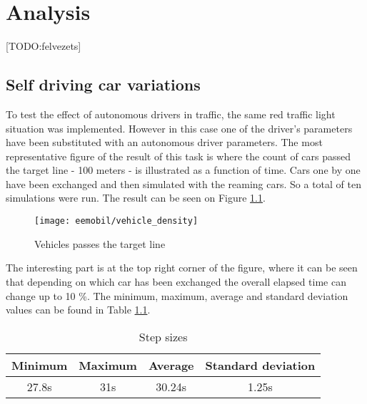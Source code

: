 \chapter{Analysis}
	[TODO:felvezets]
	\section{Self driving car variations}
		To test the effect of autonomous drivers in traffic, the same red traffic light situation was implemented. However in this case one of the driver's parameters have been substituted with an autonomous driver parameters. The most representative figure of the result of this task is where the count of cars passed the target line - 100 meters - is illustrated as a function of time. Cars one by one have been exchanged and then simulated with the reaming cars. So a total of ten simulations were run. The result can be seen on Figure \ref{fig:vehicle_density}.
		\begin{figure}[ht]
			\centering
			\texttt{[image: eemobil/vehicle\_density]}
			\caption{Vehicles passes the target line}
			\label{fig:vehicle_density}
		\end{figure}

		The interesting part is at the top right corner of the figure, where it can be seen that depending on which car has been exchanged the overall elapsed time can change up to 10 \%. The minimum, maximum, average and standard deviation values can be found in Table \ref{tab:vehicle_density_minmaxavg}.
		\begin{table}[ht]
			\begin{center}
				\begin{tabular}{ |c|c|c|c|}
					\hline
					Minimum& Maximum & Average& Standard deviation\\
					\hline
					27.8s&31s&30.24s&1.25s\\
					\hline
				\end{tabular}
			\end{center}
			\caption{Step sizes}
			\label{tab:vehicle_density_minmaxavg}
		\end{table}
		
